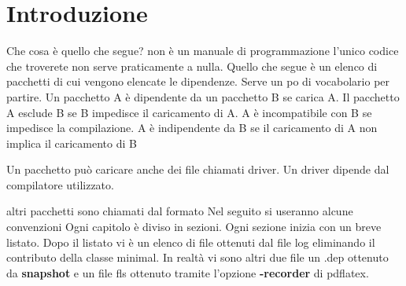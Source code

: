 \chapter{Introduzione}
Che cosa è quello che segue? non è un manuale di programmazione l'unico codice che troverete non serve praticamente a nulla. Quello che segue è un elenco di pacchetti di cui vengono elencate le dipendenze. Serve un po di vocabolario per partire. Un pacchetto A è dipendente da un pacchetto B se carica A. Il pacchetto A esclude B se B impedisce il caricamento di A.   A è incompatibile con B se impedisce la compilazione. A è indipendente da B se il caricamento di A non implica il caricamento di B


Un pacchetto può caricare anche dei file chiamati driver. Un driver dipende dal compilatore utilizzato.

altri  pacchetti sono chiamati dal formato
Nel seguito si useranno alcune convenzioni 
Ogni capitolo è diviso in sezioni. Ogni sezione inizia con un breve listato. Dopo il listato vi è un elenco di file ottenuti dal file log eliminando il contributo della classe minimal. In realtà  vi sono altri due file un .dep ottenuto da \textbf{snapshot} e un file fls ottenuto tramite l'opzione  \textbf{-recorder}  di pdflatex.   




